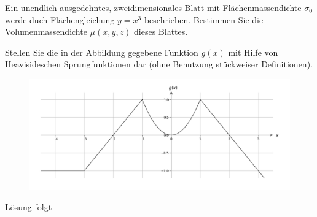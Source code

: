 \documentclass{atistandalonetask}
\begin{document}
  \begin{atiTask}[
    title = Heaviside-Funktion und Delta-Distribution
  ]
\begin{atiSubtasks}
\item Ein unendlich ausgedehntes, zweidimensionales Blatt mit Flächenmassendichte $\sigma_0$ werde duch Flächengleichung $y=x^3$ beschrieben. Bestimmen Sie die Volumenmassendichte $\mu(x,y,z)$ dieses Blattes. 

\item Stellen Sie die in der Abbildung gegebene Funktion $g(x)$ mit Hilfe von Heavisideschen Sprungfunktionen dar (ohne Benutzung stückweiser Definitionen).  
  \begin{figure}[H]
\centering
\includegraphics[width=0.8\linewidth]{./picture-heaviside_ii}

\end{figure}
\end{atiSubtasks}
  	
  \end{atiTask}
  \begin{atiSolution}
   	Lösung folgt
  \end{atiSolution}
\end{document}
